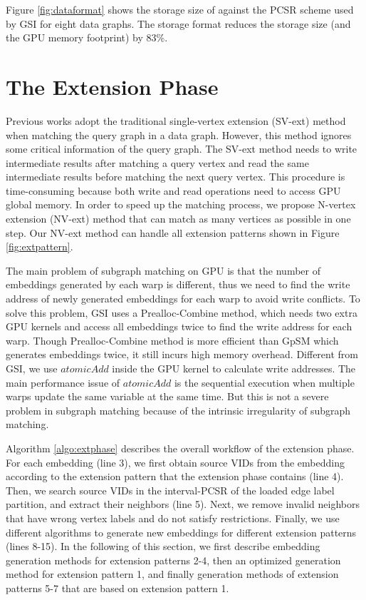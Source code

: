 Figure \ref{fig:dataformat} shows the storage size of \SystemName against the PCSR scheme used by GSI for eight data graphs. The \SystemName storage
format reduces the storage size (and the GPU memory footprint) by 83\%.


\section{The Extension Phase\label{sec:extensionphase}}
Previous works \cite{zeng2020gsi,sun2020subgraph} adopt the traditional single-vertex extension (SV-ext) method when matching the query graph in a data graph. However, this method ignores some critical information of the query graph. The SV-ext method needs to write intermediate results after matching a query vertex and read the same intermediate results before matching the next query vertex. This procedure is time-consuming because both write and read operations need to access GPU global memory. In order to speed up the matching process, we propose N-vertex extension (NV-ext) method that can match as many vertices as possible in one step. Our NV-ext method can handle all extension patterns shown in Figure \ref{fig:extpattern}.

The main problem of subgraph matching on GPU is that the number of embeddings generated by each warp is different, thus we need to find the write address of newly generated embeddings for each warp to avoid write conflicts. To solve this problem, GSI \cite{zeng2020gsi} uses a Prealloc-Combine method, which needs two extra GPU kernels and access all embeddings twice to find the write address for each warp. Though Prealloc-Combine method is more efficient than GpSM \cite{tran2015fast} which generates embeddings twice, it still incurs high memory overhead. Different from GSI, we use $atomicAdd$ inside the GPU kernel to calculate write addresses. The main performance issue of $atomicAdd$ is the sequential execution when multiple warps update the same variable at the same time. But this is not a severe problem in subgraph matching because of the intrinsic irregularity of subgraph matching.


Algorithm \ref{algo:extphase} describes the overall workflow of the extension phase. For each embedding (line 3), we first obtain source VIDs from the embedding according to the extension pattern that the extension phase contains (line 4). Then, we search source VIDs in the interval-PCSR of the loaded edge label partition, and extract their neighbors (line 5).  Next, we remove invalid neighbors that have wrong vertex labels and do not satisfy restrictions. Finally, we use different algorithms to generate new embeddings for different extension patterns (lines 8-15). In the following of this section, we first describe embedding generation methods for extension patterns 2-4, then an optimized generation method for extension pattern 1, and finally generation methods of extension patterns 5-7 that are based on extension pattern 1. 

